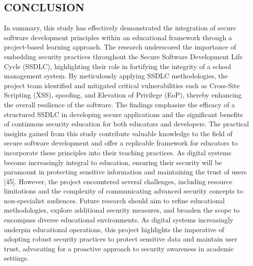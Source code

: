 \documentclass[letterpaper,twocolumn]{article}
\begin{document}
\subsection{CONCLUSION}
In summary, this study has effectively demonstrated the integration of secure software development principles within an educational framework through a project-based learning approach. The research underscored the importance of embedding security practices throughout the Secure Software Development Life Cycle (SSDLC), highlighting their role in fortifying the integrity of a school management system. By meticulously applying SSDLC methodologies, the project team identified and mitigated critical vulnerabilities such as Cross-Site Scripting (XSS), spoofing, and Elevation of Privilege (EoP), thereby enhancing the overall resilience of the software.
The findings emphasize the efficacy of a structured SSDLC in developing secure applications and the significant benefits of continuous security education for both educators and developers. The practical insights gained from this study contribute valuable knowledge to the field of secure software development and offer a replicable framework for educators to incorporate these principles into their teaching practices. As digital systems become increasingly integral to education, ensuring their security will be paramount in protecting sensitive information and maintaining the trust of users [45].
However, the project encountered several challenges, including resource limitations and the complexity of communicating advanced security concepts to non-specialist audiences. Future research should aim to refine educational methodologies, explore additional security measures, and broaden the scope to encompass diverse educational environments. As digital systems increasingly underpin educational operations, this project highlights the imperative of adopting robust security practices to protect sensitive data and maintain user trust, advocating for a proactive approach to security awareness in academic settings.
\end{document}
